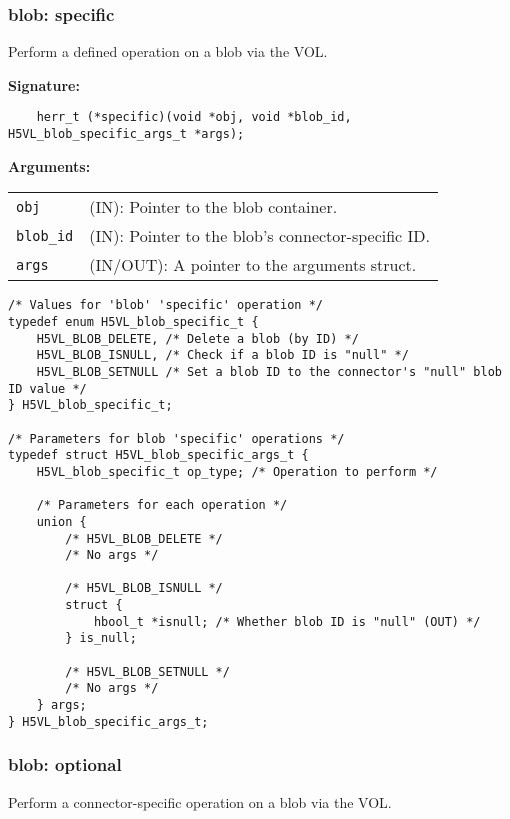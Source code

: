 \subsubsection{blob: specific}
Perform a defined operation on a blob via the VOL.

\begin{mdframed}[style=bgbox]
\textbf{Signature:}
\begin{lstlisting}
    herr_t (*specific)(void *obj, void *blob_id, H5VL_blob_specific_args_t *args);
\end{lstlisting}

\textbf{Arguments:}\\
\begin{tabular}{l p{13.5cm}}
  \texttt{obj} & (IN): Pointer to the blob container.\\
  \texttt{blob\_id} & (IN): Pointer to the blob's connector-specific ID.\\
  \texttt{args} & (IN/OUT): A pointer to the arguments struct.\\
\end{tabular}
\end{mdframed}

\begin{lstlisting}
/* Values for 'blob' 'specific' operation */
typedef enum H5VL_blob_specific_t {
    H5VL_BLOB_DELETE, /* Delete a blob (by ID) */
    H5VL_BLOB_ISNULL, /* Check if a blob ID is "null" */
    H5VL_BLOB_SETNULL /* Set a blob ID to the connector's "null" blob ID value */
} H5VL_blob_specific_t;

/* Parameters for blob 'specific' operations */
typedef struct H5VL_blob_specific_args_t {
    H5VL_blob_specific_t op_type; /* Operation to perform */

    /* Parameters for each operation */
    union {
        /* H5VL_BLOB_DELETE */
        /* No args */

        /* H5VL_BLOB_ISNULL */
        struct {
            hbool_t *isnull; /* Whether blob ID is "null" (OUT) */
        } is_null;

        /* H5VL_BLOB_SETNULL */
        /* No args */
    } args;
} H5VL_blob_specific_args_t;
\end{lstlisting}

\subsubsection{blob: optional}
Perform a connector-specific operation on a blob via the VOL.

